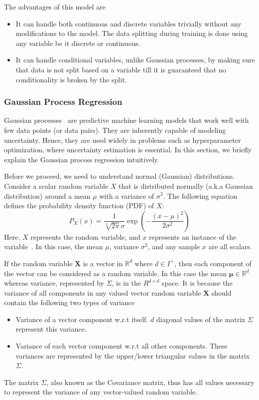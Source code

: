 \documentclass[11pt]{report}
\begin{document}
   The advantages of this model are
   \begin{itemize}
   \item It can handle both continuous and discrete variables trivially without any modifications to the model.
The data splitting during training is done using any variable be it discrete or continuous.
	\item It can handle conditional variables, unlike Gaussian processes, by making sure that data is not split based on a variable till it is guaranteed that no conditionality is broken by the split.
   \end{itemize}


\subsubsection{Gaussian Process Regression}

Gaussian processes~\cite{GPTutorial} are predictive machine learning models that work well with few data points (or data pairs). 
They are inherently capable of modeling uncertainty.
Hence, they are used widely in problems such as hyperparameter optimization, where uncertainty estimation is essential.
In this section, we briefly explain the Gaussian process regression intuitively.

Before we proceed,  we need to understand normal (Gaussian) distributions. 
Consider a scalar random variable $X$ that is distributed normally  (a.k.a Gaussian distribution) around a mean $\mu$ with a variance of $\sigma^2$.
The following equation defines the probability density function (PDF) of $X$: 
$$
P_X(x) = \frac{1}{\sqrt[2]{2\pi}\sigma}\exp\left(- \frac{(x - \mu)^2}{2\sigma^2}\right)
$$
Here, $X$ represents the random variable, and $x$ represents an instance of the variable~\cite{GPTutorial}.
In this case,  the mean $\mu$,  variance $\sigma^2$, and any sample $x$ are all scalars.

If the random variable $\textbf{X}$ is a vector in $\mathbb{R}^d$ where $d \in I^{+}$,  then each component of the vector can be considered as a random variable.
In this case the mean $\boldsymbol{\mu} \in \mathbb{R}^d$ whereas variance, represented by $\Sigma$, is in the $R^{d \times d}$ space.
It is because the variance of all components in any valued vector random variable $\textbf{X}$ should contain the following two types of variance
\begin{itemize}
\item Variance of a vector component w.r.t itself.
$d$ diagonal values of the matrix $\Sigma$ represent this variance.
\item Variance of each vector component w.r.t all other components. These variances are represented by the upper/lower triangular values in the matrix $\Sigma$.
\end{itemize}
The matrix $\Sigma$, also known as the Covariance matrix, thus has all values necessary to represent the variance of any vector-valued random variable.
\end{document}
